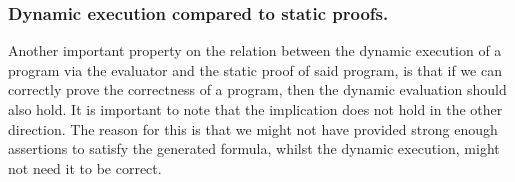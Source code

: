 
\subsubsection{Dynamic execution compared to static proofs.}
Another important property on the relation between the dynamic execution of a program via the evaluator and the static proof of said program, is that if we can correctly prove the correctness of a program, then the dynamic evaluation should also hold. It is important to note that the implication does not hold in the other direction. The reason for this is that we might not have provided strong enough assertions to satisfy the generated formula, whilst the dynamic execution, might not need it to be correct.

